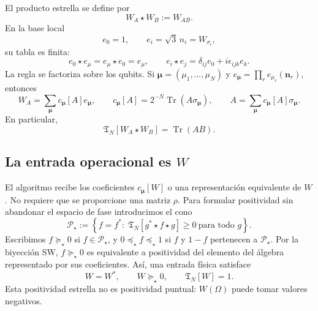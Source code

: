 \documentclass[11pt,a4paper]{article}
\newcommand{\Tr}{\operatorname{Tr}}
\newcommand{\Tfun}{\mathfrak T}
\newcommand{\Pstar}{\mathcal P_{\star}}
\newcommand{\starprod}{\star}
\theoremstyle{definition}
\begin{document}
El producto estrella se define por
\begin{equation}
 W_A\starprod W_B:=W_{AB}.
 \label{eq:star-def}
\end{equation}
En la base local
\begin{equation}
 e_0=1,\qquad e_i=\sqrt3\,n_i=W_{\sigma_i},
 \label{eq:e-basis}
\end{equation}
su tabla es finita:
\begin{equation}
 e_0\starprod e_\mu=e_\mu\starprod e_0=e_\mu,
 \qquad
 e_i\starprod e_j=\delta_{ij}e_0+i\epsilon_{ijk}e_k.
 \label{eq:star-table}
\end{equation}
La regla se factoriza sobre los qubits. Si
$\bm\mu=(\mu_1,\ldots,\mu_N)$ y
$e_{\bm\mu}=\prod_r e_{\mu_r}(\bm n_r)$, entonces
\begin{equation}
 W_A=\sum_{\bm\mu}c_{\bm\mu}[A]e_{\bm\mu},
 \qquad
 c_{\bm\mu}[A]=2^{-N}\Tr(A\sigma_{\bm\mu}),
 \qquad
 A=\sum_{\bm\mu}c_{\bm\mu}[A]\sigma_{\bm\mu}.
 \label{eq:coefficients}
\end{equation}
En particular,
\begin{equation}
 \Tfun_N[W_A\starprod W_B]=\Tr(AB).
 \label{eq:star-trace}
\end{equation}

\subsection{La entrada operacional es \texorpdfstring{$W$}{W}}

El algoritmo recibe los coeficientes $c_{\bm\mu}[W]$ o una representación
equivalente de $W$. No requiere que se proporcione una matriz $\rho$. Para
formular positividad sin abandonar el espacio de fase introducimos el cono
\begin{equation}
 \Pstar:=\left\{f=f^*:\;
 \Tfun_N[g^*\starprod f\starprod g]\geq0
 \ \text{para todo }g\right\}.
 \label{eq:star-positive-cone}
\end{equation}
Escribimos $f\succeq_\star0$ si $f\in\Pstar$, y
$0\preceq_\star f\preceq_\star1$ si $f$ y $1-f$ pertenecen a $\Pstar$.
Por la biyección SW, $f\succeq_\star0$ es equivalente a positividad del elemento
del álgebra representado por sus coeficientes. Así, una entrada física satisface
\begin{equation}
 W=W^*,\qquad W\succeq_\star0,\qquad \Tfun_N[W]=1.
 \label{eq:physical-W}
\end{equation}
Esta positividad estrella no es positividad puntual: $W(\Omega)$ puede tomar
valores negativos.
\end{document}
